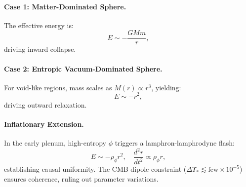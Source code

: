 \paragraph{Case 1: Matter-Dominated Sphere.} The effective energy is:
\[
E \sim -\frac{G M m}{r},
\]
driving inward collapse.

\paragraph{Case 2: Entropic Vacuum-Dominated Sphere.} For void-like regions, mass scales as \(M(r) \propto r^3\), yielding:
\[
E \sim -r^2,
\]
driving outward relaxation.

\paragraph{Inflationary Extension.} In the early plenum, high-entropy \(\phi\) triggers a lamphron-lamphrodyne flash:
\[
E \sim -\rho_{\phi} r^2, \quad \frac{d^2 r}{dt^2} \propto \rho_{\phi} r,
\]
establishing causal uniformity. The CMB dipole constraint (\(\Delta \Upsilon_* \lesssim \text{few} \times 10^{-5}\)) ensures coherence, ruling out parameter variations.
